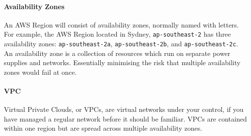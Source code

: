 \documentclass{csse4400}
\begin{document}
\paragraph{Availability Zones}
An AWS Region will consist of availability zones, normally named with letters.
For example, the AWS Region located in Sydney, \texttt{ap-southeast-2} has three availability zones:
\texttt{ap-southeast-2a}, \texttt{ap-southeast-2b}, and \texttt{ap-southeast-2c}.
An availability zone is a collection of resources which run on separate power supplies and networks.
Essentially minimising the risk that multiple availability zones would fail at once.

\paragraph{VPC}
Virtual Private Clouds, or VPCs,
are virtual networks under your control,
if you have managed a regular network before it should be familiar.
VPCs are contained within one region but are spread across multiple availability zones.
\end{document}
